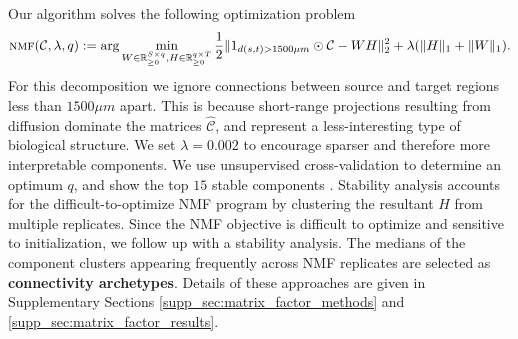 Our algorithm solves the following optimization problem
\begin{eqnarray*}
\label{eq:nmf}
\textsc{nmf}(\mathcal C, \lambda, q) := \arg \min_{W\in \mathbb R^{S \times q}_{\geq 0}, H \in \mathbb R^{q  \times T}_{\geq 0}} \frac{1}{2}\| 1_{d(s,t) > 1500 \mu m} \odot \mathcal C - WH\|_2^2  + \lambda  (\|H \|_1 + \|W \|_1) .
\end{eqnarray*}
For this decomposition we ignore connections between source and target regions less than  $1500 \mu m$ apart.
This is because short-range projections resulting from diffusion dominate the matrices $\hat {\mathcal C}$, and represent a less-interesting type of biological structure.
We set $\lambda = 0.002$ to encourage sparser and therefore more interpretable components.
We use unsupervised cross-validation to determine an optimum $q$, and show the top $15$ stable components \citep{Perry2009-ia}.
Stability analysis accounts for the difficult-to-optimize NMF program by clustering the resultant $H$ from multiple replicates.
Since the NMF objective is difficult to optimize and sensitive to initialization, we follow up with a stability analysis.
The medians of the component clusters appearing frequently across NMF replicates are selected as \textbf{connectivity archetypes}.
Details of these approaches are given in Supplementary Sections \ref{supp_sec:matrix_factor_methods} and \ref{supp_sec:matrix_factor_results}.